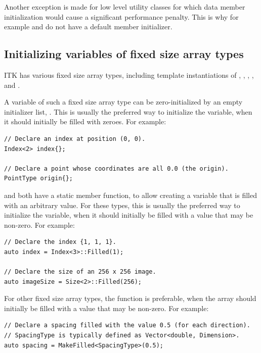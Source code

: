 Another exception is made for low level utility classes for which data member
initialization would cause a significant performance penalty. This is why for
example  and 
do not have a default member initializer.

\subsection{Initializing variables of fixed size array types}%
\label{subsec:InitializingVariablesOfFixedSizeArrayTypes}

ITK has various fixed size array types, including template instantiations of
, , , , and .

A variable of such a fixed size array type can be zero-initialized by an empty
initializer list, \code{{}}. This is usually the preferred way to initialize the
variable, when it should initially be filled with zeroes. For example:

\small
\begin{verbatim}
// Declare an index at position (0, 0).
Index<2> index{};

// Declare a point whose coordinates are all 0.0 (the origin).
PointType origin{};
\end{verbatim}
\normalsize

 and  both have a static  member
function, to allow creating a variable that is filled with an arbitrary value.
For these types, this is usually the preferred way to initialize the variable,
when it should initially be filled with a value that may be non-zero. For
example:

\small
\begin{verbatim}
// Declare the index {1, 1, 1}.
auto index = Index<3>::Filled(1);

// Declare the size of an 256 x 256 image.
auto imageSize = Size<2>::Filled(256);
\end{verbatim}
\normalsize

For other fixed size array types, the function 
is preferable, when the array should initially be filled with a value that may
be non-zero. For example:

\small
\begin{verbatim}
// Declare a spacing filled with the value 0.5 (for each direction).
// SpacingType is typically defined as Vector<double, Dimension>.
auto spacing = MakeFilled<SpacingType>(0.5);
\end{verbatim}
\normalsize

